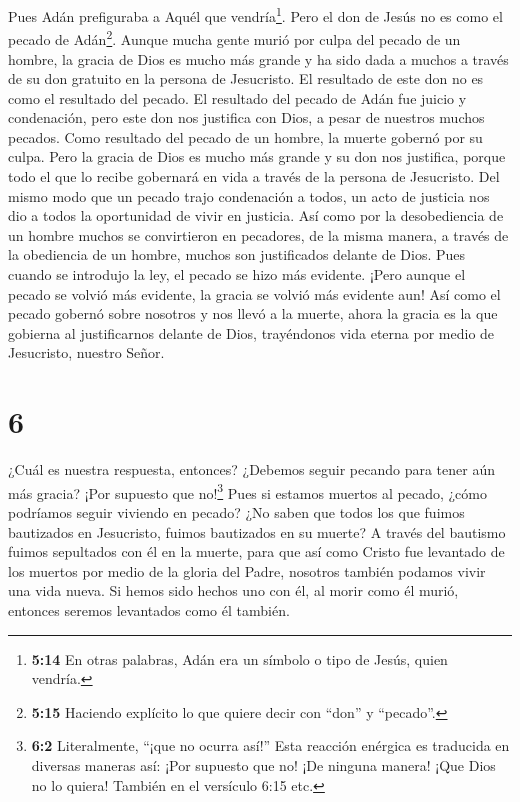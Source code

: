Pues Adán prefiguraba a Aquél que vendría\footnote{\textbf{5:14} En
  otras palabras, Adán era un símbolo o tipo de Jesús, quien vendría.}.
 Pero el don de Jesús no es como el pecado de
Adán\footnote{\textbf{5:15} Haciendo explícito lo que quiere decir con
  ``don'' y ``pecado''.}. Aunque mucha gente murió por culpa del pecado
de un hombre, la gracia de Dios es mucho más grande y ha sido dada a
muchos a través de su don gratuito en la persona de Jesucristo.
 El resultado de este don no es como el resultado del
pecado. El resultado del pecado de Adán fue juicio y condenación, pero
este don nos justifica con Dios, a pesar de nuestros muchos pecados.
 Como resultado del pecado de un hombre, la muerte gobernó
por su culpa. Pero la gracia de Dios es mucho más grande y su don nos
justifica, porque todo el que lo recibe gobernará en vida a través de la
persona de Jesucristo.  Del mismo modo que un pecado trajo
condenación a todos, un acto de justicia nos dio a todos la oportunidad
de vivir en justicia.  Así como por la desobediencia de un
hombre muchos se convirtieron en pecadores, de la misma manera, a través
de la obediencia de un hombre, muchos son justificados delante de Dios.
 Pues cuando se introdujo la ley, el pecado se hizo más
evidente. ¡Pero aunque el pecado se volvió más evidente, la gracia se
volvió más evidente aun!  Así como el pecado gobernó sobre
nosotros y nos llevó a la muerte, ahora la gracia es la que gobierna al
justificarnos delante de Dios, trayéndonos vida eterna por medio de
Jesucristo, nuestro Señor.

\hypertarget{section-5}{%
\section{6}\label{section-5}}

 ¿Cuál es nuestra respuesta, entonces? ¿Debemos seguir
pecando para tener aún más gracia?  ¡Por supuesto que
no!\footnote{\textbf{6:2} Literalmente, ``¡que no ocurra así!'' Esta
  reacción enérgica es traducida en diversas maneras así: ¡Por supuesto
  que no! ¡De ninguna manera! ¡Que Dios no lo quiera! También en el
  versículo 6:15 etc.} Pues si estamos muertos al pecado, ¿cómo
podríamos seguir viviendo en pecado?  ¿No saben que todos
los que fuimos bautizados en Jesucristo, fuimos bautizados en su muerte?
 A través del bautismo fuimos sepultados con él en la
muerte, para que así como Cristo fue levantado de los muertos por medio
de la gloria del Padre, nosotros también podamos vivir una vida nueva.
 Si hemos sido hechos uno con él, al morir como él murió,
entonces seremos levantados como él también.


